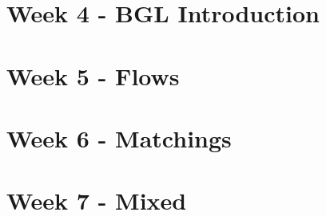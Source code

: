 \documentclass[a4paper,titlepage]{article}
\begin{document}
\newpage
\part{Week 4 - BGL Introduction}









\newpage
\part{Week 5 - Flows}







\newpage
\part{Week 6 - Matchings}









\newpage
\part{Week 7 - Mixed}



%

%

%
\end{document}
